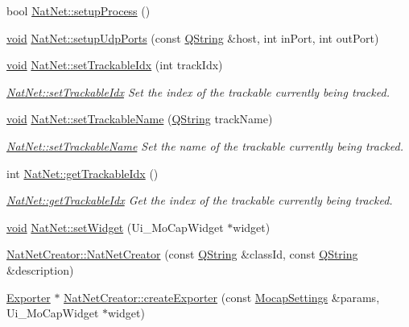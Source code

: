 \begin{DoxyCompactItemize}
bool \hyperlink{group___mo_cap_plugin_gaec62d88408f6c898d9cd6b6192b7dec8}{\-Nat\-Net\-::setup\-Process} ()
\item 
\hyperlink{group___u_a_v_objects_plugin_ga444cf2ff3f0ecbe028adce838d373f5c}{void} \hyperlink{group___mo_cap_plugin_gad51f36a3cda11c275da178b2e55ae688}{\-Nat\-Net\-::setup\-Udp\-Ports} (const \hyperlink{group___u_a_v_objects_plugin_gab9d252f49c333c94a72f97ce3105a32d}{\-Q\-String} \&host, int in\-Port, int out\-Port)
\item 
\hyperlink{group___u_a_v_objects_plugin_ga444cf2ff3f0ecbe028adce838d373f5c}{void} \hyperlink{group___mo_cap_plugin_ga92f0c84eeffa49fd021a9c5ad837947a}{\-Nat\-Net\-::set\-Trackable\-Idx} (int track\-Idx)
\begin{DoxyCompactList}\small\item\em \hyperlink{group___mo_cap_plugin_ga92f0c84eeffa49fd021a9c5ad837947a}{\-Nat\-Net\-::set\-Trackable\-Idx} \-Set the index of the trackable currently being tracked. \end{DoxyCompactList}\item 
\hyperlink{group___u_a_v_objects_plugin_ga444cf2ff3f0ecbe028adce838d373f5c}{void} \hyperlink{group___mo_cap_plugin_gac1813312de25d16f42e41c5ffd3ced8c}{\-Nat\-Net\-::set\-Trackable\-Name} (\hyperlink{group___u_a_v_objects_plugin_gab9d252f49c333c94a72f97ce3105a32d}{\-Q\-String} track\-Name)
\begin{DoxyCompactList}\small\item\em \hyperlink{group___mo_cap_plugin_gac1813312de25d16f42e41c5ffd3ced8c}{\-Nat\-Net\-::set\-Trackable\-Name} \-Set the name of the trackable currently being tracked. \end{DoxyCompactList}\item 
int \hyperlink{group___mo_cap_plugin_gabf29127f9bdc7e4667b0d495812ec2a0}{\-Nat\-Net\-::get\-Trackable\-Idx} ()
\begin{DoxyCompactList}\small\item\em \hyperlink{group___mo_cap_plugin_gabf29127f9bdc7e4667b0d495812ec2a0}{\-Nat\-Net\-::get\-Trackable\-Idx} \-Get the index of the trackable currently being tracked. \end{DoxyCompactList}\item 
\hyperlink{group___u_a_v_objects_plugin_ga444cf2ff3f0ecbe028adce838d373f5c}{void} \hyperlink{group___mo_cap_plugin_ga5c9af1ea346e9baf803728c2e0f94dc8}{\-Nat\-Net\-::set\-Widget} (\-Ui\-\_\-\-Mo\-Cap\-Widget $\ast$widget)
\item 
\hyperlink{group___mo_cap_plugin_ga7eceb6d31ea96db4e00bdf9c6765b4b7}{\-Nat\-Net\-Creator\-::\-Nat\-Net\-Creator} (const \hyperlink{group___u_a_v_objects_plugin_gab9d252f49c333c94a72f97ce3105a32d}{\-Q\-String} \&class\-Id, const \hyperlink{group___u_a_v_objects_plugin_gab9d252f49c333c94a72f97ce3105a32d}{\-Q\-String} \&description)
\item 
\hyperlink{class_exporter}{\-Exporter} $\ast$ \hyperlink{group___mo_cap_plugin_ga1d23a419317ce602e13c9dffd77de68a}{\-Nat\-Net\-Creator\-::create\-Exporter} (const \hyperlink{group___mo_cap_plugin_ga6083347a5b3eb70e360f599354dc0f0b}{\-Mocap\-Settings} \&params, \-Ui\-\_\-\-Mo\-Cap\-Widget $\ast$widget)
\end{DoxyCompactItemize}
